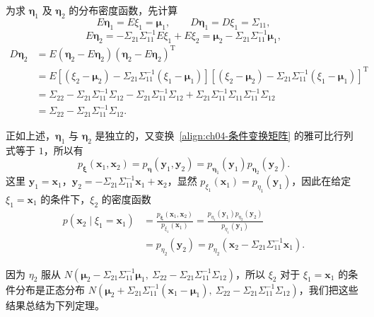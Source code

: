 \documentclass[../../main.tex]{subfiles}
\begin{document}
为求 $\boldsymbol{\eta}_1$ 及 $\boldsymbol{\eta}_2$ 的分布密度函数，先计算
\[
E\boldsymbol{\eta}_1=E\xi_1=\boldsymbol{\mu}_1,\qquad D\boldsymbol{\eta}_1=D\xi_1=\Sigma_{11},
\]
\[
E\boldsymbol{\eta}_2=-\Sigma_{21}\Sigma_{11}^{-1}E\xi_1+E\xi_2=\boldsymbol{\mu}_2-\Sigma_{21}\Sigma_{11}^{-1}\boldsymbol{\mu}_1,
\]
\begin{align*}
D\boldsymbol{\eta}_2&=E(\boldsymbol{\eta}_2-E\boldsymbol{\eta}_2)(\boldsymbol{\eta}_2-E\boldsymbol{\eta}_2)^{\mathrm{T}}\\
&=E\left[(\xi_2-\boldsymbol{\mu}_2)-\Sigma_{21}\Sigma_{11}^{-1}(\xi_1-\boldsymbol{\mu}_1)\right]
\left[(\xi_2-\boldsymbol{\mu}_2)-\Sigma_{21}\Sigma_{11}^{-1}(\xi_1-\boldsymbol{\mu}_1)\right]^{\mathrm{T}}\\
&=\Sigma_{22}-\Sigma_{21}\Sigma_{11}^{-1}\Sigma_{12}-\Sigma_{21}\Sigma_{11}^{-1}\Sigma_{12}+\Sigma_{21}\Sigma_{11}^{-1}\Sigma_{11}\Sigma_{11}^{-1}\Sigma_{12}\\
&=\Sigma_{22}-\Sigma_{21}\Sigma_{11}^{-1}\Sigma_{12}.
\end{align*}

正如上述，$\boldsymbol{\eta}_1$ 与 $\boldsymbol{\eta}_2$ 是独立的，又变换~\eqref{align:ch04-条件变换矩阵} 的雅可比行列式等于 $1$，所以有
\[
p_{\boldsymbol{\xi}}(\boldsymbol{x}_1,\boldsymbol{x}_2)=p_{\boldsymbol{\eta}}(\boldsymbol{y}_1,\boldsymbol{y}_2)=p_{\boldsymbol{\eta}_1}(\boldsymbol{y}_1)p_{\boldsymbol{\eta}_2}(\boldsymbol{y}_2).
\]
这里 $\boldsymbol{y}_1=\boldsymbol{x}_1$，$\boldsymbol{y}_2=-\Sigma_{21}\Sigma_{11}^{-1}\boldsymbol{x}_1+\boldsymbol{x}_2$，显然 $p_{\xi_1}(\boldsymbol{x}_1)=p_{\eta_1}(\boldsymbol{y}_1)$，因此在给定 $\xi_1=\boldsymbol{x}_1$ 的条件下，$\xi_2$ 的密度函数
\begin{align*}
p(\boldsymbol{x}_2\mid\xi_1=\boldsymbol{x}_1)
&=\frac{p_{\boldsymbol{\xi}}(\boldsymbol{x}_1,\boldsymbol{x}_2)}{p_{\xi_1}(\boldsymbol{x}_1)}
=\frac{p_{\eta_1}(\boldsymbol{y}_1)p_{\eta_2}(\boldsymbol{y}_2)}{p_{\eta_1}(\boldsymbol{y}_1)}\\
&=p_{\eta_2}(\boldsymbol{y}_2)=p_{\eta_2}(\boldsymbol{x}_2-\Sigma_{21}\Sigma_{11}^{-1}\boldsymbol{x}_1).
\end{align*}

因为 $\eta_2$ 服从 $N(\boldsymbol{\mu}_2-\Sigma_{21}\Sigma_{11}^{-1}\boldsymbol{\mu}_1,\ \Sigma_{22}-\Sigma_{21}\Sigma_{11}^{-1}\Sigma_{12})$，所以 $\xi_2$ 对于 $\xi_1=\boldsymbol{x}_1$ 的条件分布是正态分布 $N(\boldsymbol{\mu}_2+\Sigma_{21}\Sigma_{11}^{-1}(\boldsymbol{x}_1-\boldsymbol{\mu}_1),\ \Sigma_{22}-\Sigma_{21}\Sigma_{11}^{-1}\Sigma_{12})$，我们把这些结果总结为下列定理。
\end{document}
